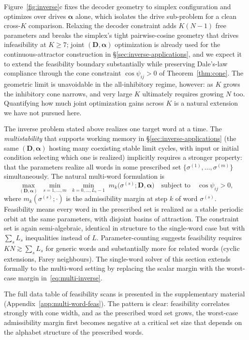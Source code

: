 \documentclass[12pt]{article}
\newcommand{\vv}[1]{\mathbf{#1}}
\begin{document}
Figure~\ref{fig:inverse}c fixes the decoder geometry to simplex configuration and optimizes over drives $\boldsymbol{\alpha}$ alone, which isolates the drive sub-problem for a clean cross-$K$ comparison. Relaxing the decoder constraint adds $K(N-1)$ free parameters and breaks the simplex's tight pairwise-cosine geometry that drives infeasibility at $K\geq 7$; joint $(\vv{D},\boldsymbol{\alpha})$ optimization is already used for the continuous-attractor construction in \S\ref{sec:inverse-applications}, and we expect it to extend the feasibility boundary substantially while preserving Dale's-law compliance through the cone constraint $\cos\psi_{ij}>0$ of Theorem~\ref{thm:cone}. The geometric limit is unavoidable in the all-inhibitory regime, however: as $K$ grows the inhibitory cone narrows, and very large $K$ ultimately requires growing $N$ too. Quantifying how much joint optimization gains across $K$ is a natural extension we have not pursued here.


The inverse problem stated above realizes one target word at a time. The \emph{multistability} that supports working memory in \S\ref{sec:inverse-applications} (the same $(\vv{D},\boldsymbol{\alpha})$ hosting many coexisting stable limit cycles, with input or initial condition selecting which one is realized) implicitly requires a stronger property: that the parameters realize all words in some prescribed set $\{\sigma^{(1)},\ldots,\sigma^{(m)}\}$ simultaneously. The natural multi-word formulation is
\begin{equation}\label{eq:multi-inverse}
    \max_{(\vv{D},\boldsymbol{\alpha})}\;\min_{s=1,\ldots,m}\;\min_{k=0,\ldots,L_s-1}\;m_k\bigl(\sigma^{(s)};\vv{D},\boldsymbol{\alpha}\bigr)\quad\text{subject to}\quad\cos\psi_{ij}>0,
\end{equation}
where $m_k(\sigma^{(s)};\cdot)$ is the admissibility margin at step $k$ of word $\sigma^{(s)}$. Feasibility means every word in the prescribed set is realized as a stable periodic orbit at the same parameters, with disjoint basins of attraction. The constraint set is again semi-algebraic, identical in structure to the single-word case but with $\sum_s L_s$ inequalities instead of $L$. Parameter-counting suggests feasibility requires $KN\gtrsim\sum_s L_s$ for generic words and substantially more for related words (cyclic extensions, Farey neighbours). The single-word solver of this section extends formally to the multi-word setting by replacing the scalar margin with the worst-case margin in~\eqref{eq:multi-inverse}.

The full data table of feasibility scans is presented in the supplementary material (Appendix~\ref{app:multi-word-feas}). The pattern is clear: feasibility correlates strongly with cone width, and as the prescribed word set grows, the worst-case admissibility margin first becomes negative at a critical set size that depends on the alphabet structure of the prescribed words.
\end{document}
